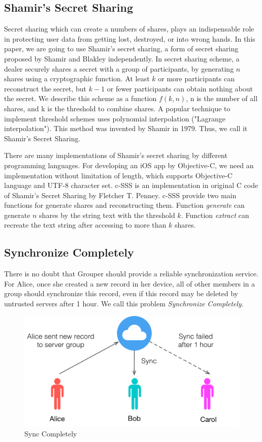 \documentclass[twocolumn,10pt]{article}
\begin{document}
\subsection{Shamir's Secret Sharing}
Secret sharing which can create a numbers of shares, plays an indispensable role in protecting user data from getting lost, destroyed, or into wrong hands. In this paper, we are going to use Shamir's secret sharing, a form of secret sharing proposed by Shamir and Blakley independently. In secret sharing scheme, a dealer securely shares a secret with a group of participants, by generating $n$ shares using a cryptographic function\cite{smith2013layered}. At least $k$ or more participants can reconstruct the secret, but $k-1$ or fewer participants can obtain nothing about the secret\cite{pang2005new}. We describe this scheme as a function $f(k, n)$, n is the number of all shares, and k is the threshold to combine shares. A popular technique to implement threshold schemes uses polynomial interpolation ("Lagrange interpolation"). This method was invented by Shamir in 1979. Thus, we call it Shamir's Secret Sharing.

There are many implementations of Shamir's secret sharing by different programming languages. For developing an iOS app by Objective-C, we need an implementation without limitation of length, which supports Objective-C language and UTF-8 character set. c-SSS\cite{c-sss} is an implementation in original C code of Shamir's Secret Sharing by Fletcher T. Penney. c-SSS provide two main functions for generate shares and reconstructing them. Function \emph{generate} can generate $n$ shares by the string text with the threshold $k$. Function \emph{extract} can recreate the text string after accessing to more than $k$ shares.

\subsection{Synchronize Completely}
There is no doubt that Grouper should provide a reliable synchronization service. For Alice, once she created a new record in her device, all of other members in a group should synchronize this record, even if this record may be deleted by untrusted servers after 1 hour. We call this problem \emph{Synchronize Completely}.

\begin{figure}[t]
\centering
\includegraphics[scale=0.4]{sync_completely}
\caption{Sync Completely}
\end{figure}
\end{document}
